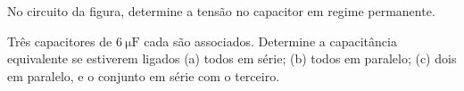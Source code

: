 \begin{questao}[2]{}

No circuito da figura, determine a tensão no capacitor em regime permanente.




\end{questao}
\begin{questao}[2]{}

Três capacitores de $\SI{6}{\micro\farad}$ cada são associados. Determine a
capacitância equivalente se estiverem ligados (a) todos em série; (b) todos em
paralelo; (c) dois em paralelo, e o conjunto em série com o terceiro.


\end{questao}

